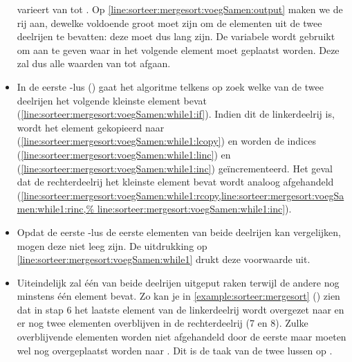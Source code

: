 \begin{itemize}
        varieert van  tot .
        Op \cref{line:sorteer:mergesort:voegSamen:output} maken we de rij
         aan, dewelke voldoende groot moet zijn om de elementen
        uit de twee deelrijen te bevatten: deze moet dus  lang zijn.
        De variabele  wordt gebruikt om aan te geven waar in
         het volgende element moet geplaatst worden. Deze zal
        dus alle waarden van  tot  afgaan.
  \item In de eerste -lus
        ()
        gaat het algoritme telkens op zoek welke van de twee deelrijen
        het volgende kleinste element bevat (\cref{line:sorteer:mergesort:voegSamen:while1:if}).
        Indien dit de linkerdeelrij is, wordt het element gekopieerd naar
         (\cref{line:sorteer:mergesort:voegSamen:while1:lcopy}) en
        worden de indices  (\cref{line:sorteer:mergesort:voegSamen:while1:linc})
        en  (\cref{line:sorteer:mergesort:voegSamen:while1:inc}) ge\"incrementeerd.
        Het geval dat de rechterdeelrij het kleinste element bevat wordt analoog afgehandeld
        (\cref{line:sorteer:mergesort:voegSamen:while1:rcopy,line:sorteer:mergesort:voegSamen:while1:rinc,%
        line:sorteer:mergesort:voegSamen:while1:inc}).
  \item Opdat de eerste -lus de eerste elementen van beide deelrijen
        kan vergelijken, mogen deze niet leeg zijn. De uitdrukking
         op \cref{line:sorteer:mergesort:voegSamen:while1}
        drukt deze voorwaarde uit.
  \item Uiteindelijk zal \'e\'en van beide deelrijen uitgeput raken terwijl de andere nog minstens
        \'e\'en element bevat. Zo kan je in \cref{example:sorteer:mergesort} ()
        zien dat in stap 6 het laatste element van de linkerdeelrij wordt overgezet
        naar  en er nog twee elementen overblijven in de rechterdeelrij (7 en 8).
        Zulke overblijvende elementen worden niet afgehandeld door de eerste  maar
        moeten wel nog overgeplaatst worden naar . Dit is de taak
        van de twee lussen op
        .

\end{itemize}
